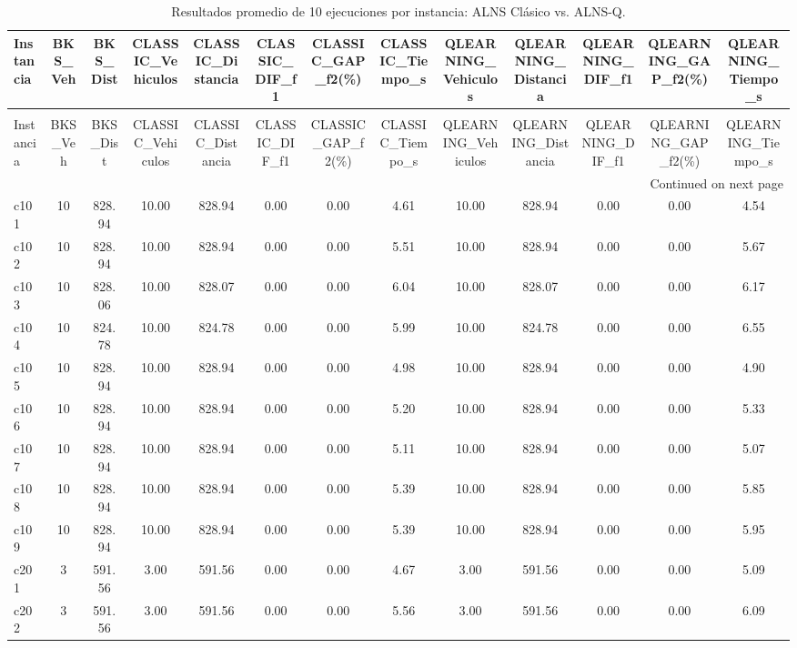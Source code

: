 \begin{longtable}{lcccccccccccc}
\caption{Resultados promedio de 10 ejecuciones por instancia: ALNS Clásico vs. ALNS-Q.} \label{tab:resultados_56_instancias} \\
\toprule
Instancia & BKS\_Veh & BKS\_Dist & CLASSIC\_Vehiculos & CLASSIC\_Distancia & CLASSIC\_DIF\_f1 & CLASSIC\_GAP\_f2(\%) & CLASSIC\_Tiempo\_s & QLEARNING\_Vehiculos & QLEARNING\_Distancia & QLEARNING\_DIF\_f1 & QLEARNING\_GAP\_f2(\%) & QLEARNING\_Tiempo\_s \\
\midrule
\endfirsthead
\caption[]{Resultados promedio de 10 ejecuciones por instancia: ALNS Clásico vs. ALNS-Q.} \\
\toprule
Instancia & BKS\_Veh & BKS\_Dist & CLASSIC\_Vehiculos & CLASSIC\_Distancia & CLASSIC\_DIF\_f1 & CLASSIC\_GAP\_f2(\%) & CLASSIC\_Tiempo\_s & QLEARNING\_Vehiculos & QLEARNING\_Distancia & QLEARNING\_DIF\_f1 & QLEARNING\_GAP\_f2(\%) & QLEARNING\_Tiempo\_s \\
\midrule
\endhead
\midrule
\multicolumn{13}{r}{Continued on next page} \\
\midrule
\endfoot
\bottomrule
\endlastfoot
c101 & 10 & 828.94 & 10.00 & 828.94 & 0.00 & 0.00 & 4.61 & 10.00 & 828.94 & 0.00 & 0.00 & 4.54 \\
c102 & 10 & 828.94 & 10.00 & 828.94 & 0.00 & 0.00 & 5.51 & 10.00 & 828.94 & 0.00 & 0.00 & 5.67 \\
c103 & 10 & 828.06 & 10.00 & 828.07 & 0.00 & 0.00 & 6.04 & 10.00 & 828.07 & 0.00 & 0.00 & 6.17 \\
c104 & 10 & 824.78 & 10.00 & 824.78 & 0.00 & 0.00 & 5.99 & 10.00 & 824.78 & 0.00 & 0.00 & 6.55 \\
c105 & 10 & 828.94 & 10.00 & 828.94 & 0.00 & 0.00 & 4.98 & 10.00 & 828.94 & 0.00 & 0.00 & 4.90 \\
c106 & 10 & 828.94 & 10.00 & 828.94 & 0.00 & 0.00 & 5.20 & 10.00 & 828.94 & 0.00 & 0.00 & 5.33 \\
c107 & 10 & 828.94 & 10.00 & 828.94 & 0.00 & 0.00 & 5.11 & 10.00 & 828.94 & 0.00 & 0.00 & 5.07 \\
c108 & 10 & 828.94 & 10.00 & 828.94 & 0.00 & 0.00 & 5.39 & 10.00 & 828.94 & 0.00 & 0.00 & 5.85 \\
c109 & 10 & 828.94 & 10.00 & 828.94 & 0.00 & 0.00 & 5.39 & 10.00 & 828.94 & 0.00 & 0.00 & 5.95 \\
c201 & 3 & 591.56 & 3.00 & 591.56 & 0.00 & 0.00 & 4.67 & 3.00 & 591.56 & 0.00 & 0.00 & 5.09 \\
c202 & 3 & 591.56 & 3.00 & 591.56 & 0.00 & 0.00 & 5.56 & 3.00 & 591.56 & 0.00 & 0.00 & 6.09 \\

\end{longtable}

